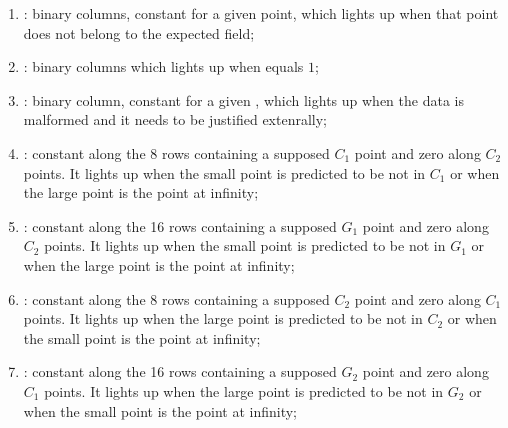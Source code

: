 \begin{enumerate}[resume]

      \item \both{\malformedDataExternalBit} \blsPrediction{}: binary columns, constant for a given point, which lights up when that point does not belong to the expected field; %
      \item \both{\malformedDataExternalAcc}: binary columns which lights up when \malformedDataExternalBit{} equals $1$;              
      \item \both{\malformedDataExternalJustification}: binary column, constant for a given \blsId, which lights up when the data is malformed and it needs to be justified extenrally;
      
      \item \both{\cOneMembershipTestRequired}:
            constant along the 8 rows containing a supposed $C_1$ point and zero along $C_2$ points. It lights up when the small point is predicted to be not in $C_1$ or when the large point is the point at infinity; 
      \item \both{\gOneMembershipTestRequired}:
            constant along the 16 rows containing a supposed $G_1$ point and zero along $C_2$ points. It lights up when the small point is predicted to be not in $G_1$ or when the large point is the point at infinity; 
      \item \both{\cTwoMembershipTestRequired}:
            constant along the 8 rows containing a supposed $C_2$ point and zero along $C_1$ points. It lights up when the large point is predicted to be not in $C_2$ or when the small point is the point at infinity;
      \item \both{\gTwoMembershipTestRequired}:
            constant along the 16 rows containing a supposed $G_2$ point and zero along $C_1$ points. It lights up when the large point is predicted to be not in $G_2$ or when the small point is the point at infinity;
\end{enumerate}
     
